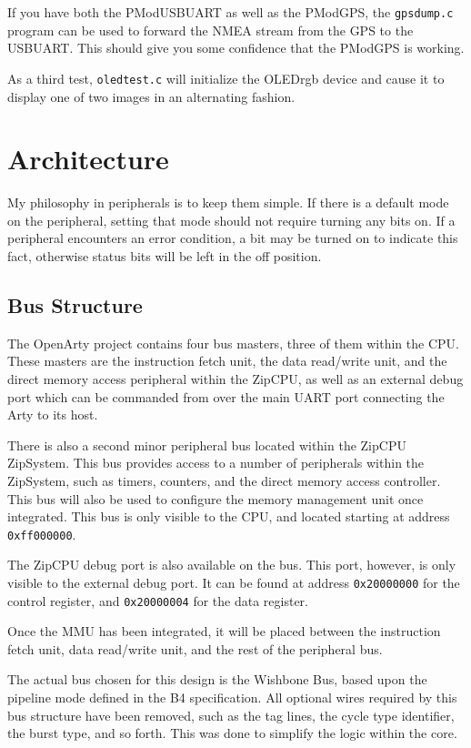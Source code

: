 \documentclass{gqtekspec}
\begin{document}
If you have both the PModUSBUART as well as the PModGPS, the {\tt gpsdump.c}
program can be used to forward the NMEA stream from the GPS to the USBUART. 
This should give you some confidence that the PModGPS is working.

As a third test, {\tt oledtest.c} will initialize the OLEDrgb device and cause
it to display one of two images in an alternating fashion.

\chapter{Architecture}\label{ch:architecture}
My philosophy in peripherals is to keep them simple.  If there is a default
mode on the peripheral, setting that mode should not require turning any bits
on.  If a peripheral encounters an error condition, a bit may be turned on to
indicate this fact, otherwise status bits will be left in the off position.

\section{Bus Structure}
The OpenArty project contains four bus masters, three of them within the CPU.
These masters are the instruction fetch unit, the data read/write unit,
and the direct memory access peripheral within the ZipCPU, as well as an 
external debug port which can be commanded from over the main UART port
connecting the Arty to its host.  

There is also a second minor peripheral bus located within the ZipCPU
ZipSystem.  This bus provides access to a number of peripherals within the
ZipSystem, such as timers, counters, and the direct memory access controller.
This bus will also be used to configure the memory management unit once
integrated.  This bus is only visible to the CPU, and located starting at
address {\tt 0xff000000}.

The ZipCPU debug port is also available on the bus.  This port, however, is
only visible to the external debug port.  It can be found at address
{\tt 0x20000000} for the control register, and {\tt 0x20000004} for the
data register.

Once the MMU has been integrated, it will be placed between the instruction
fetch unit, data read/write unit, and the rest of the peripheral bus.

The actual bus chosen for this design is the Wishbone Bus, based upon the
pipeline mode defined in the B4 specification.  All optional wires required
by this bus structure have been removed, such as the tag lines, the cycle
type identifier, the burst type, and so forth.  This was done to simplify
the logic within the core.
\end{document}
